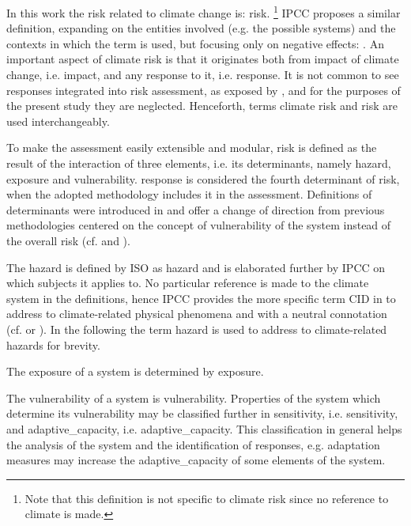 In this work the \gls{risk} related to climate change is: \glsdesc{risk}.%
\footnote{Note that this definition is not specific to climate \gls{risk} since no reference to climate is made.}
\Gls{IPCC} proposes a similar definition, expanding on the entities involved (e.g. the possible systems) and the contexts in which the term is used, but focusing only on negative effects: .
An important aspect of climate \gls{risk} is that it originates both from \gls{impact} of climate change, i.e. \glsdesc{impact}, and any response to it, i.e. \glsdesc{response}. It is not common to see \glspl{response} integrated into risk assessment, as exposed by \cite[492]{2021SimpsonAFramework}, and for the purposes of the present study they are neglected.
Henceforth, terms climate \gls{risk} and \gls{risk} are used interchangeably.

To make the assessment easily extensible and modular, \gls{risk} is defined as the result of the interaction of three elements, i.e. its \glspl{determinant}, namely \gls{hazard}, \gls{exposure} and \gls{vulnerability}. \Gls{response} is considered the fourth \gls{determinant} of \gls{risk}, when the adopted methodology includes it in the assessment.
Definitions of \glspl{determinant} were introduced in \cite[69-70]{2012FieldManagingThe} and offer a change of direction from previous methodologies centered on the concept of \gls{vulnerability} of the system instead of the overall \gls{risk} (cf. \cite{2017GIZTheVulnerability} and \cite{2017GIZRiskSupplement}).

The \gls{hazard} is defined by \gls{ISO} as \glsdesc{hazard} and is elaborated further by \gls{IPCC} on which subjects it applies to. No particular reference is made to the climate system in the definitions, hence \gls{IPCC} provides the more specific term \gls{CID} in \cite[2224]{2021MatthewsAnnexVII} to address to climate-related physical phenomena and with a neutral connotation (cf. \cite[10]{2020ReisingerTheConcept} or \cite[1871-1872]{2021RanasingheClimateChange}). In the following the term \gls{hazard} is used to address to climate-related \glspl{hazard} for brevity.

The \gls{exposure} of a system is determined by \glsdesc{exposure}.

The \gls{vulnerability} of a system is \glsdesc{vulnerability}. Properties of the system which determine its \gls{vulnerability} may be classified further in \gls{sensitivity}, i.e. \glsdesc{sensitivity}, and \gls{adaptive_capacity}, i.e. \glsdesc{adaptive_capacity}. This classification in general helps the analysis of the system and the identification of responses, e.g. \gls{adaptation} measures may increase the \gls{adaptive_capacity} of some elements of the system.

